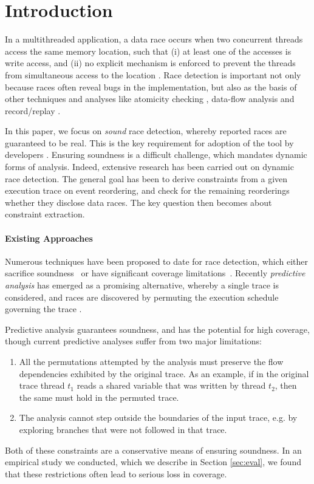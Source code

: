 \section{Introduction}\label{Se:introduction}

In a multithreaded application, a data race occurs when two concurrent threads access the same memory location, such that (i) at least one of the accesses is write access, and (ii) no explicit mechanism is enforced to prevent the threads from simultaneous access to the location \cite{eraser}. Race detection is important not only because races often reveal bugs in the implementation, but also as the basis of other techniques and analyses like atomicity checking \cite{learning,avio,ordervio}, data-flow analysis \cite{dataflow} and record/replay \cite{leap,replay2012}.

In this paper, we focus on \emph{sound} race detection, whereby reported races are guaranteed to be real. This is the key requirement for adoption of the tool by developers \cite{XXX}. Ensuring soundness is a difficult challenge, which mandates dynamic forms of analysis. Indeed, extensive research has been carried out on dynamic race detection. The general goal has been to derive constraints from a given execution trace on event reordering, and check for the remaining reorderings whether they disclose data races. The key question then becomes about constraint extraction.

\paragraph{Existing Approaches} 
Numerous techniques have been proposed to date for race detection, which either sacrifice soundness~\cite{ucg,XXX,YYY,ZZZ}  or have significant coverage limitations~\cite{XXX,YYY,ZZZ}. Recently \emph{predictive analysis} has emerged as a promising alternative, whereby a single trace is considered, and races are discovered by permuting the execution schedule governing the trace \cite{JEFF,YANNIS}. 

Predictive analysis guarantees soundness, and has the potential for high coverage, though current predictive analyses suffer from two major limitations:
\begin{enumerate}
	\item All the permutations attempted by the analysis must preserve the flow dependencies exhibited by the original trace. As an example, if in the original trace thread $t_1$ reads a shared variable that was written by thread $t_2$, then the same must hold in the permuted trace.
	\item The analysis cannot step outside the boundaries of the input trace, e.g. by exploring branches that were not followed in that trace.
\end{enumerate}
Both of these constraints are a conservative means of ensuring soundness. In an empirical study we conducted, which we describe in Section \ref{sec:eval}, we found that these restrictions often lead to serious loss in coverage. 

